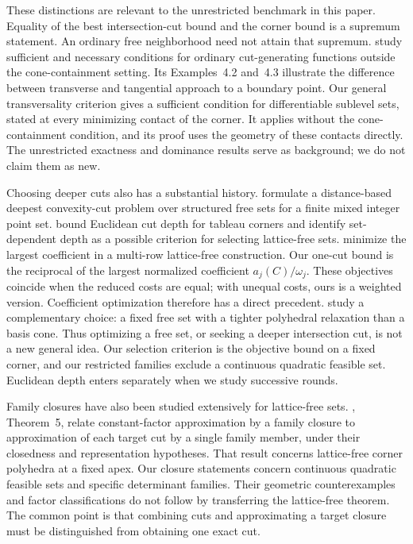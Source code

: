 These distinctions are relevant to the unrestricted benchmark in this
paper. Equality of the best intersection-cut bound and the corner bound
is a supremum statement. An ordinary free neighborhood need not attain
that supremum. \citet{KKYang2017} study sufficient
and necessary conditions for ordinary cut-generating functions outside
the cone-containment setting. Its Examples~4.2 and~4.3 illustrate the
difference between transverse and tangential approach to a boundary
point. Our general transversality criterion gives a sufficient condition
for differentiable sublevel sets, stated at every minimizing contact of
the corner. It applies without the cone-containment condition, and its
proof uses the geometry of these contacts directly. The unrestricted
exactness and dominance results serve as background; we do not claim
them as new.

Choosing deeper cuts also has a substantial history.
\citet{EN2005} formulate a distance-based deepest convexity-cut problem
over structured free sets for a finite mixed integer point set.
\citet{PoirrierYu2019} bound Euclidean cut depth for
tableau corners and identify set-dependent depth as a possible criterion
for selecting lattice-free sets. \citet{XavierFukasawaPoirrier2021} minimize
the largest coefficient in a multi-row lattice-free construction. Our
one-cut bound is the reciprocal of the largest normalized coefficient
$a_j(C)/\omega_j$. These objectives coincide when the reduced costs are
equal; with unequal costs, ours is a weighted version. Coefficient
optimization therefore has a direct precedent.
\citet{BalasMargot2013} study a
complementary choice: a fixed free set with a tighter polyhedral
relaxation than a basis cone. Thus optimizing a free set, or seeking a
deeper intersection cut, is not a new general idea. Our selection
criterion is the objective bound on a fixed corner, and our restricted
families exclude a continuous quadratic feasible set. Euclidean depth
enters separately when we study successive rounds.

Family closures have also been studied extensively for lattice-free
sets. \citet{ABP2018}, Theorem~5, relate constant-factor approximation
by a family closure to approximation of each target cut by a single
family member, under their closedness and representation hypotheses.
That result concerns lattice-free corner polyhedra at a fixed apex.
Our closure statements concern continuous quadratic feasible sets and
specific determinant families. Their geometric counterexamples and
factor classifications do not follow by transferring the lattice-free
theorem. The common point is that combining cuts and approximating a
target closure must be distinguished from obtaining one exact cut.


